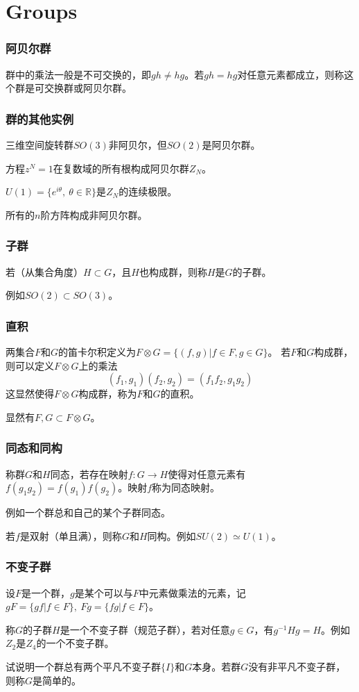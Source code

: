 \documentclass[CJK]{beamer}
\newcommand{\reals}{\mathbb{R}}
\begin{document}
\section{Groups}
\begin{frame}
\frametitle{\bch 阿贝尔群 \ech}
\bch
群中的乘法一般是不可交换的，即$gh \not= hg$。若$gh = hg$对任意元素都成立，则称这个群是可交换群或阿贝尔群。

\ech
\end{frame}

\begin{frame}
\frametitle{\bch 群的其他实例 \ech}
\bch
三维空间旋转群$SO(3)$非阿贝尔，但$SO(2)$是阿贝尔群。
\par
方程$z^N = 1$在复数域的所有根构成阿贝尔群$Z_N$。
\par
$U(1) = \{ e^{i \theta},\ \theta \in \reals\}$是$Z_N$的连续极限。
\par
所有的$n$阶方阵构成非阿贝尔群。

\ech
\end{frame}

\begin{frame}
\frametitle{\bch 子群 \ech}
\bch
若（从集合角度）$H\subset G$，且$H$也构成群，则称$H$是$G$的子群。\par
例如$SO(2) \subset SO(3)$。


\ech
\end{frame}

\begin{frame}
\frametitle{\bch 直积 \ech}
\bch
两集合$F$和$G$的笛卡尔积定义为$F\otimes G = \{ (f,g) | f\in F, g \in G\}$。
若$F$和$G$构成群，则可以定义$F\otimes G$上的乘法
$$ (f_1,g_1) (f_2,g_2) = (f_1 f_2,g_1g_2)$$
这显然使得$F\otimes G$构成群，称为$F$和$G$的直积。
\par
显然有$F,G \subset F \otimes G$。


\ech
\end{frame}

\begin{frame}
\frametitle{\bch 同态和同构 \ech}
\bch
称群$G$和$H$同态，若存在映射$f: G \to H$使得对任意元素有$f(g_1 g_2) = f(g_1) f(g_2)$。映射$f$称为同态映射。
\par
例如一个群总和自己的某个子群同态。
\par
若$f$是双射（单且满），则称$G$和$H$同构。例如$SU(2) \simeq U(1)$。


\ech
\end{frame}


\begin{frame}
\frametitle{\bch 不变子群 \ech}
\bch
设$F$是一个群，$g$是某个可以与$F$中元素做乘法的元素，记$gF = \{ gf | f \in F\},\ Fg = \{ fg | f \in F\}$。
\par
称$G$的子群$H$是一个不变子群（规范子群），若对任意$g \in G$，有$g^{-1} H g = H$。例如$Z_2$是$Z_4$的一个不变子群。
\par
试说明一个群总有两个平凡不变子群$\{I\}$和$G$本身。若群$G$没有非平凡不变子群，则称$G$是简单的。


\ech
\end{frame}
\end{document}
